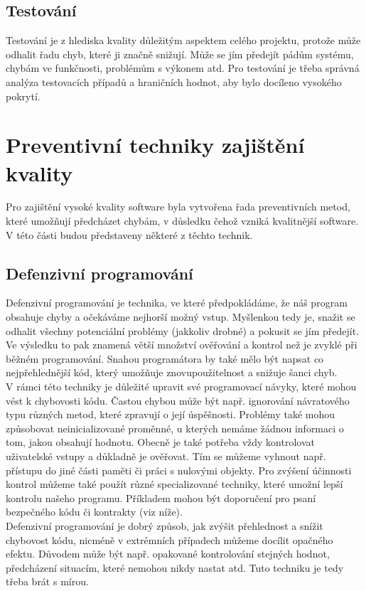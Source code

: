 	\subsection{Testování}
		Testování je z hlediska kvality důležitým aspektem celého projektu, protože může odhalit řadu chyb, které ji značně snižují. Může se jím předejít pádům systému, chybám ve funkčnosti, problémům s výkonem atd. Pro testování je třeba správná analýza testovacích případů a hraničních hodnot, aby bylo docíleno vysokého pokrytí.
	
	
\section{Preventivní techniky zajištění kvality}	
	Pro zajištění vysoké kvality software byla vytvořena řada preventivních metod, které umožňují předcházet chybám, v důsledku čehož vzniká kvalitnější software. V této části budou představeny některé z těchto technik.
		

	\subsection{Defenzivní programování}
		Defenzivní programování \cite{defProgram} je technika, ve které předpokládáme, že náš program obsahuje chyby a očekáváme nejhorší možný vstup. Myšlenkou tedy je, snažit se odhalit všechny potenciální problémy (jakkoliv drobné) a pokusit se jím předejít. Ve výsledku to pak znamená větší množství ověřování a kontrol než je zvyklé při běžném programování. Snahou programátora by také mělo být napsat co nejpřehlednější kód, který umožňuje znovupoužitelnost a snižuje šanci chyb.\\ 
		
		V rámci této techniky je důležité upravit své programovací návyky, které mohou vést k chybovosti kódu. Častou chybou může být např. ignorování návratového typu různých metod, které zpravují o její úspěšnosti. Problémy také mohou způsobovat neinicializované proměnné, u kterých nemáme žádnou informaci o tom, jakou obsahují hodnotu. Obecně je také potřeba vždy kontrolovat uživatelské vstupy a důkladně je ověřovat. Tím se můžeme vyhnout např. přístupu do jiné části paměti či práci s nulovými objekty. Pro zvýšení účinnosti kontrol můžeme také použít různé specializované techniky, které umožní lepší kontrolu našeho programu. Příkladem mohou být doporučení pro psaní bezpečného kódu či kontrakty (viz níže).\\
		
		Defenzivní programování je dobrý způsob, jak zvýšit přehlednost a snížit chybovost kódu, nicméně v extrémních případech můžeme docílit opačného efektu. Důvodem může být např. opakované kontrolování stejných hodnot, předcházení situacím, které nemohou nikdy nastat atd. Tuto techniku je tedy třeba brát s mírou.
		
